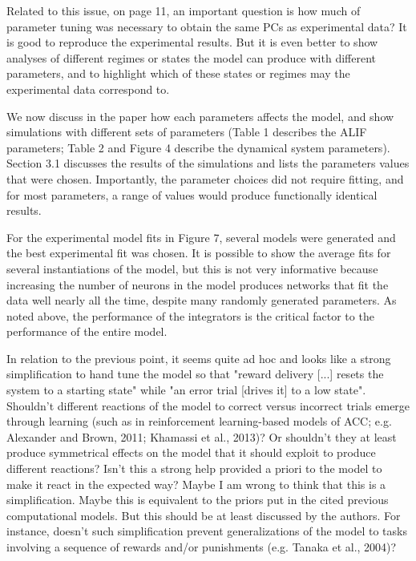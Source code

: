 \documentclass[11pt,paper=letter]{scrartcl}
\begin{document}
\begin{quoting}
  Related to this issue, on page 11, an important question is how much
  of parameter tuning was necessary to obtain the same PCs as
  experimental data? It is good to reproduce the experimental results.
  But it is even better to show analyses of different regimes or
  states the model can produce with different parameters, and to
  highlight which of these states or regimes may the experimental data
  correspond to.
\end{quoting}

We now discuss in the paper
how each parameters affects the model,
and show simulations with different sets of parameters
(Table 1 describes the ALIF parameters;
Table 2 and Figure 4 describe the
dynamical system parameters).
Section 3.1 discusses the results
of the simulations
and lists the parameters values
that were chosen.
Importantly, the parameter choices
did not require fitting,
and for most parameters,
a range of values would produce
functionally identical results.

For the experimental model fits in Figure 7,
several models were generated and the best
experimental fit was chosen.
It is possible to show the
average fits for
several instantiations of the model,
but this is not very informative because
increasing the number of neurons in the model
produces networks that fit the data well
nearly all the time,
despite many randomly generated parameters.
As noted above, the performance of the integrators
is the critical factor to the performance
of the entire model.

\begin{quoting}
  In relation to the previous point, it seems quite ad hoc and looks
  like a strong simplification to hand tune the model so that "reward
  delivery [...] resets the system to a starting state" while "an
  error trial [drives it] to a low state". Shouldn't different
  reactions of the model to correct versus incorrect trials emerge
  through learning (such as in reinforcement learning-based models of
  ACC; e.g. Alexander and Brown, 2011; Khamassi et al., 2013)? Or
  shouldn't they at least produce symmetrical effects on the model
  that it should exploit to produce different reactions? Isn't this a
  strong help provided a priori to the model to make it react in the
  expected way? Maybe I am wrong to think that this is a
  simplification. Maybe this is equivalent to the priors put in the
  cited previous computational models. But this should be at least
  discussed by the authors. For instance, doesn't such simplification
  prevent generalizations of the model to tasks involving a sequence
  of rewards and/or punishments (e.g. Tanaka et al., 2004)?
\end{quoting}
\end{document}
